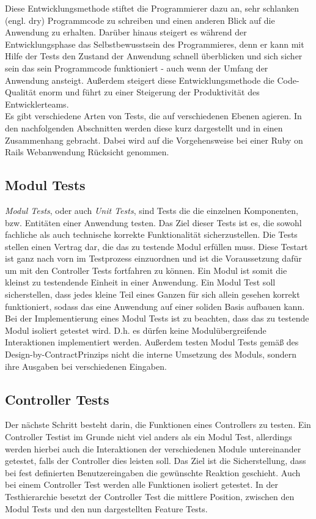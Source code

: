 \documentclass[12pt,             %
               a4paper,          %
               listof=totoc,     %
               index=totoc,      %
               bibliography=totoc,%
               oneside,         %
               BCOR1cm,          %
               english   %
               ]{scrbook}
\begin{document}
Diese Entwicklungsmethode stiftet die Programmierer dazu an, sehr schlanken (engl. \glqq dry\grqq) Programmcode zu schreiben und einen anderen Blick auf die Anwendung zu erhalten. Darüber hinaus steigert es während der Entwicklungsphase das Selbstbewusstsein des Programmieres, denn er kann mit Hilfe der Tests den Zustand der Anwendung schnell überblicken und sich sicher sein das sein Programmcode funktioniert - auch wenn der Umfang der Anwendung ansteigt. Außerdem steigert diese Entwicklungsmethode die Code-Qualität enorm und führt zu einer Steigerung der Produktivität des Entwicklerteams.\\

Es gibt verschiedene Arten von Tests, die auf verschiedenen Ebenen agieren. In den nachfolgenden Abschnitten werden diese kurz dargestellt und in einen Zusammenhang gebracht. Dabei wird auf die Vorgehensweise bei einer Ruby on Rails Webanwendung Rücksicht genommen. 

\subsection{Modul Tests}
\textit{Modul Tests}, oder auch \textit{Unit Tests}, sind Tests die die einzelnen Komponenten, bzw. Entitäten einer Anwendung testen. Das Ziel dieser Tests ist es, die sowohl fachliche als auch technische korrekte Funktionalität sicherzustellen. Die Tests stellen einen Vertrag dar, die das zu testende Modul erfüllen muss. Diese Testart ist ganz nach vorn im Testprozess einzuordnen und ist die Voraussetzung dafür um mit den Controller Tests fortfahren zu können. Ein Modul ist somit die kleinst zu testendende Einheit in einer Anwendung. Ein Modul Test soll sicherstellen, dass jedes kleine Teil eines Ganzen für sich allein gesehen korrekt funktioniert, sodass das eine Anwendung auf einer soliden Basis aufbauen kann. Bei der Implementierung eines Modul Tests ist zu beachten, dass das zu testende Modul isoliert getestet wird. D.h. es dürfen keine Modulübergreifende Interaktionen implementiert werden. Außerdem testen Modul Tests gemäß des \glqq Design-by-Contract\grqq Prinzips nicht die interne Umsetzung des Moduls, sondern ihre Ausgaben bei verschiedenen Eingaben.

\subsection{Controller Tests}
Der nächste Schritt besteht darin, die Funktionen eines Controllers zu testen. Ein \glqq Controller Test\grqq ist im Grunde nicht viel anders als ein Modul Test, allerdings werden hierbei auch die Interaktionen der verschiedenen Module untereinander getestet, falls der Controller dies leisten soll. Das Ziel ist die Sicherstellung, dass bei fest definierten Benutzereingaben die gewünschte Reaktion geschieht. Auch bei einem Controller Test werden alle Funktionen isoliert getestet. In der Testhierarchie besetzt der Controller Test die mittlere Position, zwischen den Modul Tests und den nun dargestellten Feature Tests.
\end{document}
